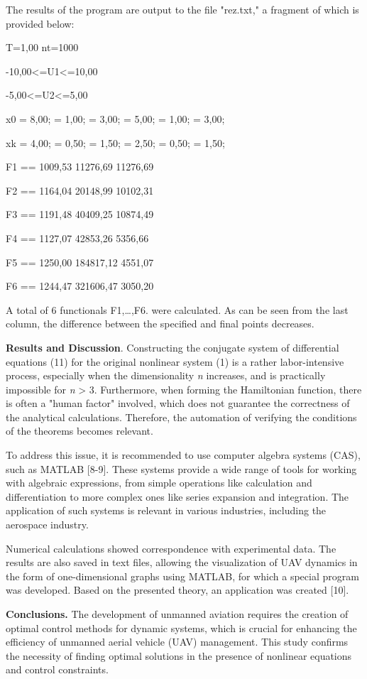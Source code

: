 The results of the program are output to the file "rez.txt," a fragment
of which is provided below:

T=1,00 nt=1000

-10,00\textless=U1\textless=10,00

-5,00\textless=U2\textless=5,00

x0 = 8,00; = 1,00; = 3,00; = 5,00; = 1,00; = 3,00;

xk = 4,00; = 0,50; = 1,50; = 2,50; = 0,50; = 1,50;

F1 == 1009,53 11276,69 11276,69

F2 == 1164,04 20148,99 10102,31

F3 == 1191,48 40409,25 10874,49

F4 == 1127,07 42853,26 5356,66

F5 == 1250,00 184817,12 4551,07

F6 == 1244,47 321606,47 3050,20

A total of 6 functionals F1,\ldots,F6. were calculated. As can be seen
from the last column, the difference between the specified and final
points decreases.

{\bfseries Results and Discussion}. Constructing the conjugate system of
differential equations (11) for the original nonlinear system (1) is a
rather labor-intensive process, especially when the dimensionality
\emph{n} increases, and is practically impossible for \emph{n}
\textgreater{} 3. Furthermore, when forming the Hamiltonian function,
there is often a "human factor" involved, which does not guarantee the
correctness of the analytical calculations. Therefore, the automation of
verifying the conditions of the theorems becomes relevant.

To address this issue, it is recommended to use computer algebra systems
(CAS), such as MATLAB {[}8-9{]}. These systems provide a wide range of
tools for working with algebraic expressions, from simple operations
like calculation and differentiation to more complex ones like series
expansion and integration. The application of such systems is relevant
in various industries, including the aerospace industry.

Numerical calculations showed correspondence with experimental data. The
results are also saved in text files, allowing the visualization of UAV
dynamics in the form of one-dimensional graphs using MATLAB, for which a
special program was developed. Based on the presented theory, an
application was created {[}10{]}.

{\bfseries Conclusions.} The development of unmanned aviation requires the
creation of optimal control methods for dynamic systems, which is
crucial for enhancing the efficiency of unmanned aerial vehicle (UAV)
management. This study confirms the necessity of finding optimal
solutions in the presence of nonlinear equations and control
constraints.

